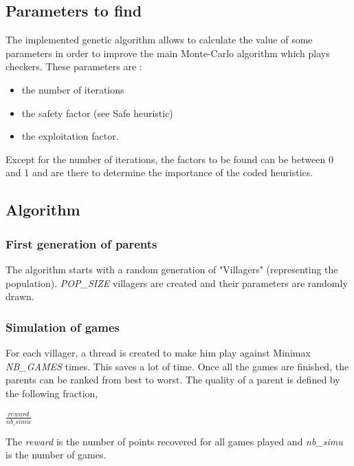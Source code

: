 \documentclass[11pt,a4paper]{article}
\begin{document}
\begin{appendices}
\subsection{Parameters to find}\label{params}
The implemented genetic algorithm allows to calculate the value of some parameters in order to improve the main Monte-Carlo algorithm which plays checkers. These parameters are : 
\begin{itemize}
    \item the number of iterations
    \item the safety factor (see Safe heuristic)
    \item the exploitation factor.
\end{itemize}
Except for the number of iterations, the factors to be found can be between 0 and 1 and are there to determine the importance of the coded heuristics.
\subsection{Algorithm}
\subsubsection{First generation of parents}
The algorithm starts with a random generation of "Villagers" (representing the population). \textit{POP\_SIZE} villagers are created and their parameters are randomly drawn.
\subsubsection{Simulation of games}
For each villager, a thread is created to make him play against Minimax \textit{NB\_GAMES} times. This saves a lot of time. Once all the games are finished, the parents can be ranked from best to worst. The quality of a parent is defined by the following fraction,
\begin{center}
    $\frac{reward}{nb\_simu}$
\end{center}
The \textit{reward} is the number of points recovered for all games played and \textit{nb\_simu} is the number of games.

\end{appendices}
\end{document}
